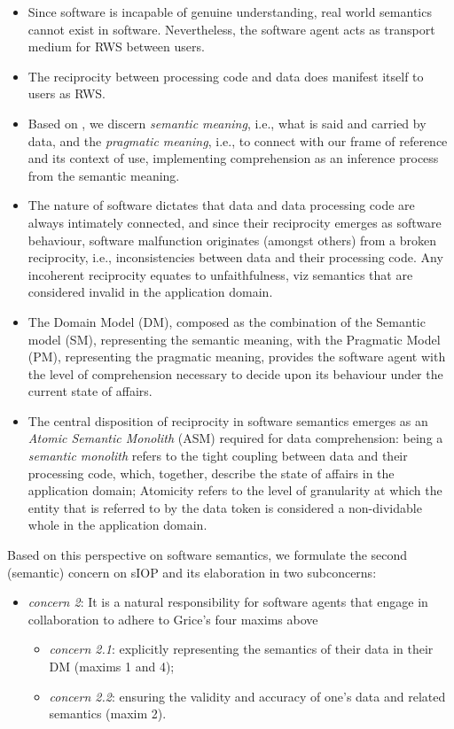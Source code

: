 \documentclass[sort&compress,preprint,authoryear,3p,twocolumn]{elsarticle}
\providecommand{\tightlist}{%
  \setlength{\itemsep}{0pt}\setlength{\parskip}{0pt}}
\begin{document}
\begin{itemize}
\tightlist
\item
  Since software is incapable of genuine understanding, real world
  semantics cannot exist in software. Nevertheless, the software agent
  acts as transport medium for RWS between users.
\item
  The reciprocity between processing code and data does manifest itself
  to users as RWS.
\item
  Based on \citep{Grice:1991BT}, we discern \emph{semantic meaning},
  i.e., what is said and carried by data, and the \emph{pragmatic
  meaning}, i.e., to connect with our frame of reference and its context
  of use, implementing comprehension as an inference process from the
  semantic meaning.
\item
  The nature of software dictates that data and data processing code are
  always intimately connected, and since their reciprocity emerges as
  software behaviour, software malfunction originates (amongst others)
  from a broken reciprocity, i.e., inconsistencies between data and
  their processing code. Any incoherent reciprocity equates to
  unfaithfulness, viz semantics that are considered invalid in the
  application domain.
\item
  The Domain Model (DM), composed as the combination of the Semantic
  model (SM), representing the semantic meaning, with the Pragmatic
  Model (PM), representing the pragmatic meaning, provides the software
  agent with the level of comprehension necessary to decide upon its
  behaviour under the current state of affairs.
\item
  The central disposition of reciprocity in software semantics emerges
  as an \emph{Atomic Semantic Monolith} (ASM) required for data
  comprehension: being a \emph{semantic monolith} refers to the tight
  coupling between data and their processing code, which, together,
  describe the state of affairs in the application domain; Atomicity
  refers to the level of granularity at which the entity that is
  referred to by the data token is considered a non-dividable whole in
  the application domain.
\end{itemize}

Based on this perspective on software semantics, we formulate the second
(semantic) concern on sIOP and its elaboration in two subconcerns:

\begin{itemize}
\tightlist
\item
  \emph{concern 2}: It is a natural responsibility for software agents
  that engage in collaboration to adhere to Grice's four maxims above

  \begin{itemize}
  \tightlist
  \item
    \emph{concern 2.1}: explicitly representing the semantics of their
    data in their DM (maxims 1 and 4);
  \item
    \emph{concern 2.2}: ensuring the validity and accuracy of one's data
    and related semantics (maxim 2).
  \end{itemize}
\end{itemize}
\end{document}

